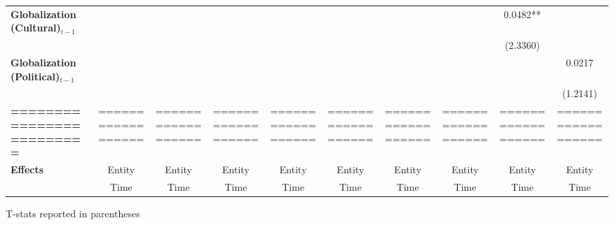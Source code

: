 \begin{center}
\begin{tabular}{lccccccccc}
\textbf{Globalization (Cultural)$_{t-1}$}             &                    &                    &                    &                    &                    &                    &                    &      0.0482**      &                     \\
\textbf{ }                         &                    &                    &                    &                    &                    &                    &                    &      (2.3360)      &                     \\
\textbf{Globalization (Political)$_{t-1}$}             &                    &                    &                    &                    &                    &                    &                    &                    &       0.0217        \\
\textbf{ }                         &                    &                    &                    &                    &                    &                    &                    &                    &      (1.2141)       \\
\textbf{=========================} & ================== & ================== & ================== & ================== & ================== & ================== & ================== & ================== & ==================  \\
\textbf{Effects}                   &       Entity       &       Entity       &       Entity       &       Entity       &       Entity       &       Entity       &       Entity       &       Entity       &       Entity        \\
\textbf{}                          &        Time        &        Time        &        Time        &        Time        &        Time        &        Time        &        Time        &        Time        &        Time         \\
\bottomrule
\end{tabular}
\end{center}

T-stats reported in parentheses